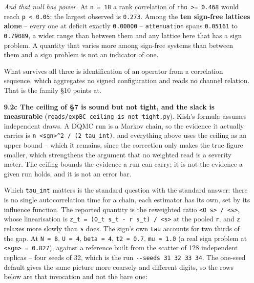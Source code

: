 \documentclass[10pt,letterpaper,twocolumn]{article}
\begin{document}
\emph{And that null has power.} At \texttt{n\ =\allowbreak{}\ 18} a rank correlation of \texttt{\textbar{}\allowbreak{}rho\textbar{}\allowbreak{}\ \textgreater{}\allowbreak{}=\allowbreak{}\ 0.\allowbreak{}468} would reach
\texttt{p\ \textless{}\allowbreak{}\ 0.\allowbreak{}05}; the largest observed is \texttt{0.\allowbreak{}273}. Among the \textbf{ten sign-free lattices alone} --
every one at deficit exactly \texttt{0.\allowbreak{}00000} -- \texttt{attenuation} spans \texttt{0.\allowbreak{}05161} to \texttt{0.\allowbreak{}79089}, a wider range
than between them and any lattice here that has a sign problem. A quantity that varies more among
sign-free systems than between them and a sign problem is not an indicator of one.

What survives all three is identification of an operator from a correlation sequence, which
aggregates no signed configuration and reads no channel relation. That is the family §10 points at.

\textbf{9.2c The ceiling of §7 is sound but not tight, and the slack is measurable}
(\texttt{reads/\allowbreak{}expBC\_\allowbreak{}ceiling\_\allowbreak{}is\_\allowbreak{}not\_\allowbreak{}tight.\allowbreak{}py}).
Kish's formula assumes independent draws. A DQMC run is a Markov chain, so the evidence it
actually carries is \texttt{n\ \textless{}\allowbreak{}sgn\textgreater{}\allowbreak{}\^{}2\ /\allowbreak{}\ (\allowbreak{}2\ tau\_\allowbreak{}int)\allowbreak{}}, and everything above uses the ceiling as an upper
bound -- which it remains, since the correction only makes the true figure smaller, which
strengthens the argument that no weighted read is a severity meter. The ceiling bounds the evidence
a run can carry; it is not the evidence a given run holds, and it is not an error bar.

Which \texttt{tau\_\allowbreak{}int} matters is the standard question with the standard answer: there is no single
autocorrelation time for a chain, each estimator has its own, set by its influence function. The
reported quantity is the reweighted ratio \texttt{\textless{}\allowbreak{}O\ s\textgreater{}\allowbreak{}\ /\allowbreak{}\ \textless{}\allowbreak{}s\textgreater{}\allowbreak{}}, whose linearisation is
\texttt{z\_\allowbreak{}t\ =\allowbreak{}\ (\allowbreak{}O\_\allowbreak{}t\ s\_\allowbreak{}t\ -{}\allowbreak{}\ r\ s\_\allowbreak{}t)\allowbreak{}\ /\allowbreak{}\ \textless{}\allowbreak{}s\textgreater{}\allowbreak{}} at the pooled \texttt{r}, and \texttt{z} relaxes more slowly than \texttt{s} does. The
sign's own \texttt{tau} accounts for two thirds of the gap.
At \texttt{N\ =\allowbreak{}\ 8}, \texttt{U\ =\allowbreak{}\ 4}, \texttt{beta\ =\allowbreak{}\ 4}, \texttt{t2\ =\allowbreak{}\ 0.\allowbreak{}7}, \texttt{mu\ =\allowbreak{}\ 1.\allowbreak{}0} (a real sign problem at \texttt{\textless{}\allowbreak{}sgn\textgreater{}\allowbreak{}\ =\allowbreak{}\ 0.\allowbreak{}827}),
against a reference built from the scatter of 128 independent replicas -- four seeds of 32, which
is the run \texttt{-{}\allowbreak{}-{}\allowbreak{}seeds\ 31\ 32\ 33\ 34}. The one-seed default gives the same picture more coarsely and
different digits, so the rows below are that invocation and not the bare one:
\end{document}
